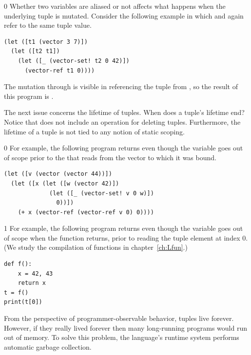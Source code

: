 \documentclass[7x10]{TimesAPriori_MIT}%
\def\racketEd{0}
\def\pythonEd{1}
\providecommand{\BookEdition}{1}
\let\edition\BookEdition
\newcommand{\pythonColor}[0]{}
\numberwithin{theorem}{chapter}
\numberwithin{definition}{chapter}
\numberwithin{equation}{chapter}
\begin{document}
{\if\edition\racketEd        
Whether two variables are aliased or not affects what happens
when the underlying tuple is mutated.
Consider the following example in which  and 
again refer to the same tuple value.
\begin{center}
\begin{minipage}{0.96\textwidth}
\begin{lstlisting}
(let ([t1 (vector 3 7)])
  (let ([t2 t1])
    (let ([_ (vector-set! t2 0 42)])
      (vector-ref t1 0))))
\end{lstlisting}
\end{minipage}
\end{center}
The mutation through  is visible in referencing the tuple
from , so the result of this program is .
\fi}

The next issue concerns the lifetime of tuples. When does a tuple's
lifetime end?  Notice that \LangVec{} does not include an operation
for deleting tuples. Furthermore, the lifetime of a tuple is not tied
to any notion of static scoping.
%
{\if\edition\racketEd        
%
For example, the following program returns  even though the
variable  goes out of scope prior to the 
that reads from the vector to which it was bound.
\begin{center}
\begin{minipage}{0.96\textwidth}
\begin{lstlisting}
(let ([v (vector (vector 44))])
  (let ([x (let ([w (vector 42)])
             (let ([_ (vector-set! v 0 w)])
               0))])
    (+ x (vector-ref (vector-ref v 0) 0))))
\end{lstlisting}
\end{minipage}
\end{center}
\fi}
%
{\if\edition\pythonEd\pythonColor
%
For example, the following program returns  even though the
variable  goes out of scope when the function returns, prior
to reading the tuple element at index $0$. (We study the compilation
of functions in chapter~\ref{ch:Lfun}.)
%  
\begin{center}
\begin{minipage}{0.96\textwidth}
\begin{lstlisting}
def f():
    x = 42, 43
    return x
t = f()
print(t[0])
\end{lstlisting}
\end{minipage}
\end{center}
\fi}
%
From the perspective of programmer-observable behavior, tuples live
forever. However, if they really lived forever then many long-running
programs would run out of memory. To solve this problem, the
language's runtime system performs automatic garbage collection.
\end{document}
